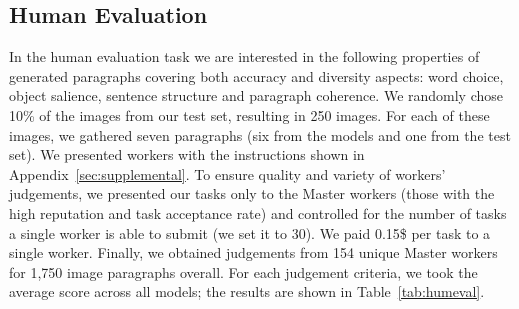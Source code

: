 \documentclass[11pt,a4paper]{article}
\begin{document}
\subsection{Human Evaluation}
\label{humaneval}
In the human evaluation task we are interested in the following properties of generated paragraphs covering both accuracy and diversity aspects: word choice, object salience, sentence structure and paragraph coherence.
We randomly chose 10\% of the images from our test set, resulting in 250 images.
For each of these images, we gathered seven paragraphs (six from the models and one from the test set).
We presented workers with the instructions shown in Appendix~\ref{sec:supplemental}.
To ensure quality and variety of workers' judgements, we presented our tasks only to the Master workers (those with the high reputation and task acceptance rate) and controlled for the number of tasks a single worker is able to submit (we set it to 30). %
We paid 0.15\$ per task to a single worker.
Finally, we obtained judgements from 154 unique Master workers for 1,750 image paragraphs overall.
For each judgement criteria, we took the average score across all models; the results are shown in Table~\ref{tab:humeval}.

\end{document}

